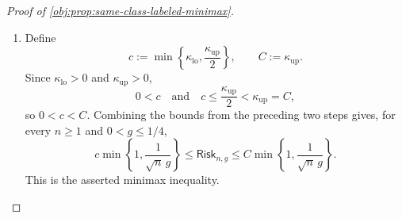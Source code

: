 \begin{proof}[Proof of \cref{obj:prop:same-class-labeled-minimax}]
\begin{enumerate}
\item Define
\[
c:=\min\left\{\kappa_{\mathrm{lo}},\frac{\kappa_{\mathrm{up}}}{2}\right\},
\qquad
C:=\kappa_{\mathrm{up}}.
\]
Since \(\kappa_{\mathrm{lo}}>0\) and \(\kappa_{\mathrm{up}}>0\),
\[
0<c
\quad\text{and}\quad
c\le\frac{\kappa_{\mathrm{up}}}{2}<\kappa_{\mathrm{up}}=C,
\]
so \(0<c<C\). Combining the bounds from the preceding two steps gives, for every \(n\ge1\) and \(0<g\le1/4\),
\[
c\min\left\{1,\frac{1}{\sqrt n\,g}\right\}
\le
\mathsf{Risk}_{n,g}
\le
C\min\left\{1,\frac{1}{\sqrt n\,g}\right\}.
\]
This is the asserted minimax inequality.
\end{enumerate}
\end{proof}

